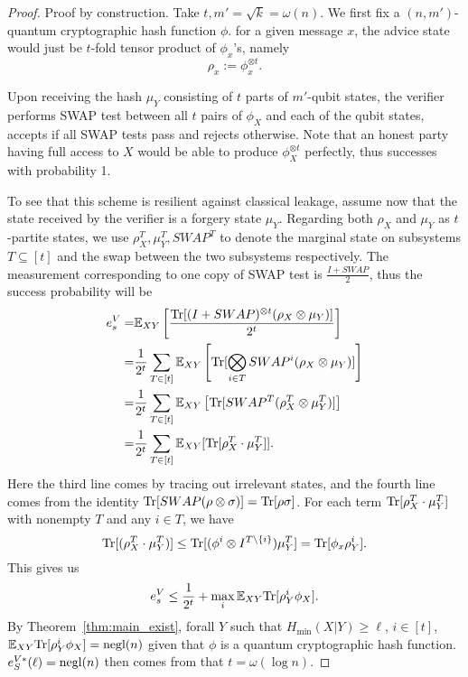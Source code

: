 \begin{proof}
    Proof by construction. Take $t,m'=\sqrt{k}=\omega(n)$. We first fix a $(n,m')$-quantum cryptographic hash function $\phi$. for a given message $x$, the advice state would just be $t$-fold tensor product of $\phi_x$'s, namely
    $$\rho_x:=\phi_x^{\otimes t}.$$

    Upon receiving the hash $\mu_Y$ consisting of $t$ parts of $m'$-qubit states, the verifier performs SWAP test between all $t$ pairs of $\phi_X$ and each of the qubit states, accepts if all SWAP tests pass and rejects otherwise. Note that an honest party having full access to $X$ would be able to produce $\phi_X^{\otimes t}$ perfectly, thus successes with probability 1.

    To see that this scheme is resilient against classical leakage, assume now that the state received by the verifier is a forgery state $\mu_Y$. Regarding both $\rho_X$ and $\mu_Y$ as $t$-partite states, we use $\rho_X^T, \mu_Y^T, SWAP^T$ to denote the marginal state on subsystems $T\subseteq[t]$ and the swap between the two subsystems respectively. The measurement corresponding to one copy of SWAP test is $\frac{I+SWAP}{2}$, thus the success probability will be
    \begin{align*}
    e_s^V=&\mathbb{E}_{XY}\left[\frac{\textnormal{Tr}[(I+SWAP)^{\otimes t}(\rho_X\otimes \mu_Y)]}{2^t}\right]\\
    =&\frac{1}{2^t}\sum_{T\in[t]}\mathbb{E}_{XY}\left[\textnormal{Tr}[\bigotimes_{i\in T}SWAP^i(\rho_X\otimes \mu_Y)]\right]\\
    =&\frac{1}{2^t}\sum_{T\in[t]}\mathbb{E}_{XY}\left[\textnormal{Tr}[SWAP^T(\rho_X^T\otimes \mu_Y^T)]\right]\\
    =&\frac{1}{2^t}\sum_{T\in[t]}\mathbb{E}_{XY}[\textnormal{Tr}[\rho_X^T \cdot \mu_Y^T]].\\
\end{align*}
Here the third line comes by tracing out irrelevant states, and the fourth line comes from the identity $\textnormal{Tr}[SWAP(\rho\otimes \sigma)]=\textnormal{Tr}[\rho\sigma]$. For each term $\textnormal{Tr}[\rho_X^T\cdot \mu_Y^T]$ with nonempty $T$ and any $i\in T$, we have
$$\textnormal{Tr}[(\rho_X^T\cdot \mu_Y^T)]\leq \textnormal{Tr}[(\phi^i\otimes I^{T\setminus\{i\}})\mu_Y^T]=\textnormal{Tr}[\phi_x\rho_Y^i].$$
This gives us
$$e_s^V\leq \frac{1}{2^t}+\max_i\mathbb{E}_{XY}\textnormal{Tr}[\rho_Y^i\phi_X].$$
By Theorem~\ref{thm:main_exist}, forall $Y$ such that $H_{\min}(X|Y)\geq \ell$, $i\in[t]$, $\mathbb{E}_{XY}\textnormal{Tr}[\rho_Y^i\phi_X]=\text{negl}(n)$ given that $\phi$ is a quantum cryptographic hash function. $e_S^{V*}(\ell)=\text{negl}(n)$ then comes from that $t=\omega(\log n)$.
\end{proof}

